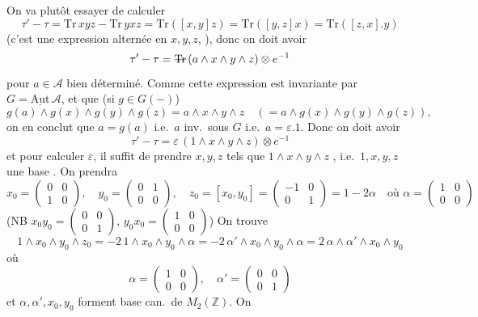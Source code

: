\documentclass[11pt,a4paper]{article}
\begin{document}
On va plutôt essayer de calculer
\[
  \tau' - \tau = \mathrm{Tr}\, xyz - \mathrm{Tr}\, yxz = \mathrm{Tr}([x,y]z)
  = \mathrm{Tr}([y,z]x) = \mathrm{Tr}([z,x].y)
\]
(c'est une expression alternée en $x, y, z$, ), donc
on doit avoir
\[
  \tau' - \tau = \text{\struck{$\mathrm{Tr}$}}\, (a \wedge x \wedge y \wedge z) \otimes e^{-1}
\]
pour $a \in \mathcal{A}$ bien déterminé. Comme cette expression est invariante par
$G = \underline{\mathrm{Aut}}\, \mathcal{A}$,  et que (si $g \in G(-)$)
\[
  g(a) \wedge g(x) \wedge g(y) \wedge g(z) = a \wedge x \wedge y \wedge z
  \quad (= a \wedge g(x) \wedge g(y) \wedge g(z)) ,
\]
on en conclut que $a = g(a)$ i.e.\ $a$ inv.\ sous $G$ i.e.\ $a = \varepsilon . 1$.
Donc on doit avoir
\[
  \tau' - \tau = \varepsilon\, (1 \wedge x \wedge y \wedge z) \otimes e^{-1}
\]
et pour calculer $\varepsilon$, il suffit de prendre $x, y, z$ tels que
$1 \wedge x \wedge y \wedge z$ , i.e.\ $1, x, y, z$ une base
. On prendra
\[
  x_0 = \begin{pmatrix} 0 & 0 \\ 1 & 0 \end{pmatrix}, \quad
  y_0 = \begin{pmatrix} 0 & 1 \\ 0 & 0 \end{pmatrix}, \quad
  z_0 = [x_0, y_0] = \begin{pmatrix} -1 & 0 \\ 0 & 1 \end{pmatrix} = 1 - 2\alpha
  \quad \text{où } \alpha = \begin{pmatrix} 1 & 0 \\ 0 & 0 \end{pmatrix}
\]
(NB
$x_0 y_0 = \begin{pmatrix} 0 & 0 \\ 0 & 1 \end{pmatrix}$,
$y_0 x_0 = \begin{pmatrix} 1 & 0 \\ 0 & 0 \end{pmatrix}$)
On trouve
\[
  1 \wedge x_0 \wedge y_0 \wedge z_0 = -2\, 1 \wedge x_0 \wedge y_0 \wedge \alpha
  = -2\, \alpha' \wedge x_0 \wedge y_0 \wedge \alpha
  = 2\, \alpha \wedge \alpha' \wedge x_0 \wedge y_0
\]
où
\[
  \alpha = \begin{pmatrix} 1 & 0 \\ 0 & 0 \end{pmatrix}, \quad
  \alpha' = \begin{pmatrix} 0 & 0 \\ 0 & 1 \end{pmatrix}
\]
et  $\alpha, \alpha', x_0, y_0$ forment base can.\ de $M_2(\mathbb{Z})$. On
\end{document}
